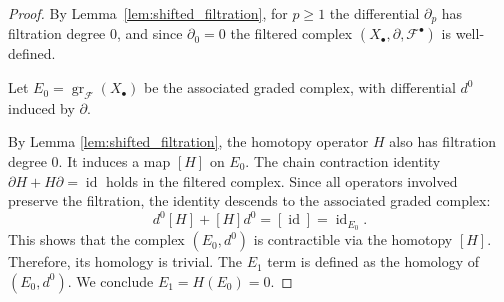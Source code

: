\begin{proof}

By Lemma~\ref{lem:shifted_filtration}, for $p\ge 1$ the differential $\partial_p$ has filtration degree $0$, and since $\partial_0=0$ the filtered complex $(X_\bullet,\partial,\mathcal{F}^\bullet)$ is well-defined.

Let $E_0 = \operatorname{gr}_{\mathcal{F}}(X_\bullet)$ be the associated graded complex, with differential $d^0$ induced by $\partial$.

By Lemma \ref{lem:shifted_filtration}, the homotopy operator $H$ also has filtration degree 0. It induces a map $[H]$ on $E_0$.
The chain contraction identity $\partial H+H\partial=\operatorname{id}$ holds in the filtered complex. Since all operators involved preserve the filtration, the identity descends to the associated graded complex:
\[
d^0 [H] + [H] d^0 = [\operatorname{id}] = \operatorname{id}_{E_0}.
\]
This shows that the complex $(E_0, d^0)$ is contractible via the homotopy $[H]$. Therefore, its homology is trivial.
The $E_1$ term is defined as the homology of $(E_0, d^0)$. We conclude $E_1 = H(E_0) = 0$.
\end{proof} 
